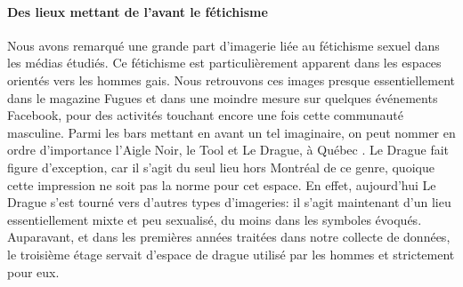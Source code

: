 \paragraph{Des lieux mettant de l'avant le fétichisme}
Nous avons remarqué une grande part d'imagerie liée au fétichisme sexuel dans les médias étudiés.
Ce fétichisme est particulièrement apparent dans les espaces orientés vers les hommes gais.
Nous retrouvons ces images presque essentiellement dans le magazine Fugues et dans une moindre mesure sur quelques événements Facebook, pour des activités touchant encore une fois cette communauté masculine.
Parmi les bars mettant en avant un tel imaginaire, on peut nommer en ordre d'importance l'Aigle Noir, le Tool et Le Drague, à Québec .
Le Drague fait figure d'exception, car il s'agit du seul lieu hors Montréal de ce genre, quoique cette impression ne soit pas la norme pour cet espace.
En effet, aujourd'hui Le Drague s'est tourné vers d'autres types d'imageries: il s'agit maintenant d'un lieu essentiellement mixte et peu sexualisé, du moins dans les symboles évoqués.
Auparavant, et dans les premières années traitées dans notre collecte de données, le troisième étage servait d'espace de drague utilisé par les hommes et strictement pour eux.

